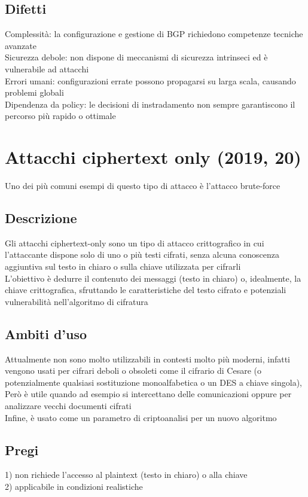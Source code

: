 \documentclass[10pt,oneside,a4paper]{article}
\begin{document}
\subsection{Difetti}
Complessità: la configurazione e gestione di BGP richiedono competenze tecniche avanzate\\
Sicurezza debole: non dispone di meccanismi di sicurezza intrinseci ed è vulnerabile ad attacchi \\
Errori umani: configurazioni errate possono propagarsi su larga scala, causando problemi globali\\
Dipendenza da policy: le decisioni di instradamento non sempre garantiscono il percorso più rapido o ottimale
\section{Attacchi ciphertext only (2019, 20)}
Uno dei più comuni esempi di questo tipo di attacco è l'attacco brute-force
\subsection{Descrizione}
Gli attacchi ciphertext-only sono un tipo di attacco crittografico in cui l'attaccante dispone solo di uno o più testi cifrati, senza alcuna conoscenza aggiuntiva sul testo in chiaro o sulla chiave utilizzata per cifrarli\\
L'obiettivo è dedurre il contenuto dei messaggi (testo in chiaro) o, idealmente, la chiave crittografica, sfruttando le caratteristiche del testo cifrato e potenziali vulnerabilità nell'algoritmo di cifratura
\subsection{Ambiti d'uso}
Attualmente non sono molto utilizzabili in contesti molto più moderni, infatti vengono usati per cifrari deboli o obsoleti come il cifrario di Cesare (o potenzialmente qualsiasi sostituzione monoalfabetica o un DES a chiave singola),\\
Però è utile quando ad esempio si intercettano delle comunicazioni oppure per analizzare vecchi documenti cifrati\\
Infine, è usato come un parametro di criptoanalisi per un nuovo algoritmo
\subsection{Pregi}
1) non richiede l'accesso al plaintext (testo in chiaro) o alla chiave\\
2) applicabile in condizioni realistiche
\end{document}
